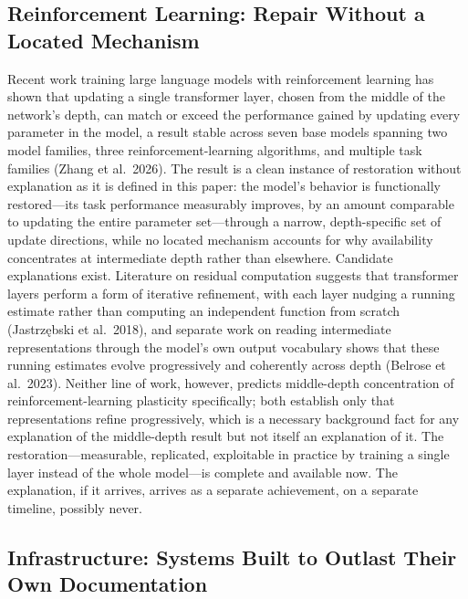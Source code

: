 \documentclass[11pt]{article}
\theoremstyle{plain}
\begin{document}
\subsection{Reinforcement Learning: Repair Without a Located Mechanism}

Recent work training large language models with reinforcement learning has shown that updating a single transformer layer, chosen from the middle of the network's depth, can match or exceed the performance gained by updating every parameter in the model, a result stable across seven base models spanning two model families, three reinforcement-learning algorithms, and multiple task families (Zhang et al.\ 2026). The result is a clean instance of restoration without explanation as it is defined in this paper: the model's behavior is functionally restored---its task performance measurably improves, by an amount comparable to updating the entire parameter set---through a narrow, depth-specific set of update directions, while no located mechanism accounts for why availability concentrates at intermediate depth rather than elsewhere. Candidate explanations exist. Literature on residual computation suggests that transformer layers perform a form of iterative refinement, with each layer nudging a running estimate rather than computing an independent function from scratch (Jastrz\k{e}bski et al.\ 2018), and separate work on reading intermediate representations through the model's own output vocabulary shows that these running estimates evolve progressively and coherently across depth (Belrose et al.\ 2023). Neither line of work, however, predicts middle-depth concentration of reinforcement-learning plasticity specifically; both establish only that representations refine progressively, which is a necessary background fact for any explanation of the middle-depth result but not itself an explanation of it. The restoration---measurable, replicated, exploitable in practice by training a single layer instead of the whole model---is complete and available now. The explanation, if it arrives, arrives as a separate achievement, on a separate timeline, possibly never.

\subsection{Infrastructure: Systems Built to Outlast Their Own Documentation}
\end{document}
